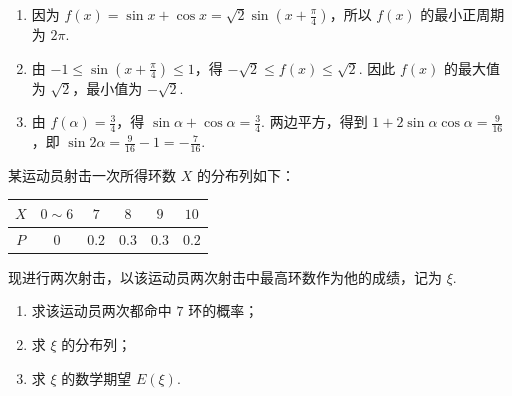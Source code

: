 \begin{solution}
\begin{enumerate}
\item 因为 \(f(x)=\sin x+\cos x=\sqrt{2}\sin\left(x+\frac{\pi}{4}\right)\)，所以 \(f(x)\) 的最小正周期为 \(2\pi\).

\item 由 \(-1\leqslant\sin\left(x+\frac{\pi}{4}\right)\leqslant1\)，得 \(-\sqrt{2}\leqslant f(x)\leqslant\sqrt{2}\).
因此 \(f(x)\) 的最大值为 \(\sqrt{2}\)，最小值为 \(-\sqrt{2}\).

\item 由 \(f(\alpha)=\frac34\)，得 \(\sin\alpha+\cos\alpha=\frac34\). 两边平方，得到 \(1+2\sin\alpha\cos\alpha=\frac{9}{16}\)，即 \(\sin2\alpha=\frac{9}{16}-1=-\frac{7}{16}\).
\end{enumerate}
\end{solution}

\begin{problem}
某运动员射击一次所得环数 \(X\) 的分布列如下：

\begin{center}
\begin{tabular}{|c|c|c|c|c|c|}
\hline
\(X\) & \(0\sim 6\) & \(7\) & \(8\) & \(9\) & \(10\) \\
\hline
\(P\) & \(0\) & \(0.2\) & \(0.3\) & \(0.3\) & \(0.2\) \\
\hline
\end{tabular}
\end{center}

现进行两次射击，以该运动员两次射击中最高环数作为他的成绩，记为 \(\xi\).

\begin{enumerate}
\item 求该运动员两次都命中 \(7\) 环的概率；
\item 求 \( \xi \) 的分布列；
\item 求 \( \xi \) 的数学期望 \( E(\xi) \).
\end{enumerate}
\end{problem}

